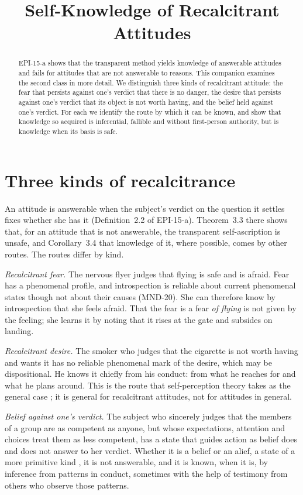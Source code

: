 \documentclass{situationist-preprint}
\title{Self-Knowledge of Recalcitrant Attitudes}
\begin{document}
\maketitle

\begin{abstract}
EPI-15-a shows that the transparent method yields knowledge of answerable attitudes and fails for attitudes that are not answerable to reasons. This companion examines the second class in more detail. We distinguish three kinds of recalcitrant attitude: the fear that persists against one's verdict that there is no danger, the desire that persists against one's verdict that its object is not worth having, and the belief held against one's verdict. For each we identify the route by which it can be known, and show that knowledge so acquired is inferential, fallible and without first-person authority, but is knowledge when its basis is safe.
\end{abstract}

\section{Three kinds of recalcitrance}

An attitude is answerable when the subject's verdict on the question it settles fixes whether she has it (Definition~2.2 of EPI-15-a). Theorem~3.3 there shows that, for an attitude that is not answerable, the transparent self-ascription is unsafe, and Corollary~3.4 that knowledge of it, where possible, comes by other routes. The routes differ by kind.

\emph{Recalcitrant fear.} The nervous flyer judges that flying is safe and is afraid. Fear has a phenomenal profile, and introspection is reliable about current phenomenal states though not about their causes (MND-20). She can therefore know by introspection that she feels afraid. That the fear is a fear \emph{of flying} is not given by the feeling; she learns it by noting that it rises at the gate and subsides on landing.

\emph{Recalcitrant desire.} The smoker who judges that the cigarette is not worth having and wants it has no reliable phenomenal mark of the desire, which may be dispositional. He knows it chiefly from his conduct: from what he reaches for and what he plans around. This is the route that self-perception theory takes as the general case \citep{Bem1972}; it is general for recalcitrant attitudes, not for attitudes in general.

\emph{Belief against one's verdict.} The subject who sincerely judges that the members of a group are as competent as anyone, but whose expectations, attention and choices treat them as less competent, has a state that guides action as belief does and does not answer to her verdict. Whether it is a belief or an alief, a state of a more primitive kind \citep{Gendler2008}, it is not answerable, and it is known, when it is, by inference from patterns in conduct, sometimes with the help of testimony from others who observe those patterns.
\end{document}
